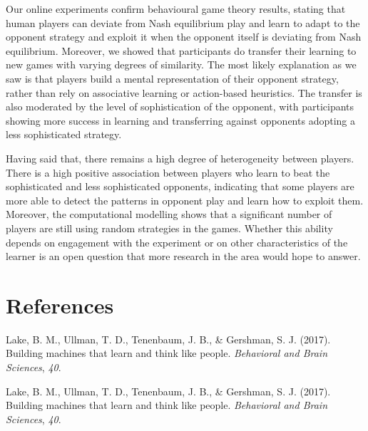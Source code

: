 \documentclass[man,floatsintext]{apa6}
\begin{document}
Our online experiments confirm behavioural game theory results, stating that human players can deviate from Nash equilibrium play and learn to adapt to the opponent strategy and exploit it when the opponent itself is deviating from Nash equilibrium. Moreover, we showed that participants do transfer their learning to new games with varying degrees of similarity. The most likely explanation as we saw is that players build a mental representation of their opponent strategy, rather than rely on associative learning or action-based heuristics. The transfer is also moderated by the level of sophistication of the opponent, with participants showing more success in learning and transferring against opponents adopting a less sophisticated strategy.

Having said that, there remains a high degree of heterogeneity between players. There is a high positive association between players who learn to beat the sophisticated and less sophisticated opponents, indicating that some players are more able to detect the patterns in opponent play and learn how to exploit them. Moreover, the computational modelling shows that a significant number of players are still using random strategies in the games. Whether this ability depends on engagement with the experiment or on other characteristics of the learner is an open question that more research in the area would hope to answer.

\newpage

\hypertarget{references}{%
\section{References}\label{references}}

\begingroup
\setlength{\parindent}{-0.5in}
\setlength{\leftskip}{0.5in}

\hypertarget{refs}{}
\leavevmode\hypertarget{ref-lake2017building}{}%
Lake, B. M., Ullman, T. D., Tenenbaum, J. B., \& Gershman, S. J. (2017). Building machines that learn and think like people. \emph{Behavioral and Brain Sciences}, \emph{40}.

\leavevmode\hypertarget{ref-lake2017building}{}%
Lake, B. M., Ullman, T. D., Tenenbaum, J. B., \& Gershman, S. J. (2017). Building machines that learn and think like people. \emph{Behavioral and Brain Sciences}, \emph{40}.

\endgroup
\end{document}
